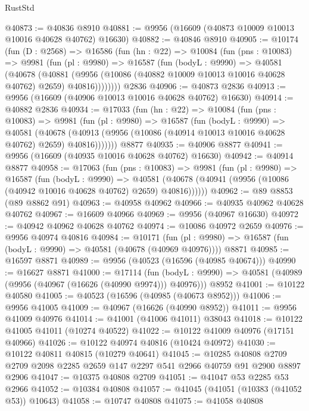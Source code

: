 \begin{lexlean}{RustStd}
\begin{coremodule}
@40873 := @40836 @8910
@40881 := @9956 (@16609 (@40873 @10009 @10013 @10016 @40628 @40762) @16630)
@40882 := @40846 @8910
@40905 := @10174
    (fun (D : @2568) =>
    @16586
      (fun (hn : @22) =>
      @10084
        (fun (pns : @10083) =>
        @9981
          (fun (pl : @9980) =>
          @16587
            (fun (bodyL : @9990) =>
            @40581
              (@40678
                (@40881
                  (@9956 (@10086 (@40882 @10009 @10013 @10016 @40628 @40762) @2659) @40816))))))))
    @2836
@40906 := @40873 @2836
@40913 := @9956 (@16609 (@40906 @10013 @10016 @40628 @40762) @16630)
@40914 := @40882 @2836
@40934 := @17033
    (fun (hn : @22) =>
    @10084
      (fun (pns : @10083) =>
      @9981
        (fun (pl : @9980) =>
        @16587
          (fun (bodyL : @9990) =>
          @40581
            (@40678 (@40913 (@9956 (@10086 (@40914 @10013 @10016 @40628 @40762) @2659) @40816)))))))
    @8877
@40935 := @40906 @8877
@40941 := @9956 (@16609 (@40935 @10016 @40628 @40762) @16630)
@40942 := @40914 @8877
@40958 := @17063
    (fun (pns : @10083) =>
    @9981
      (fun (pl : @9980) =>
      @16587
        (fun (bodyL : @9990) =>
        @40581 (@40678 (@40941 (@9956 (@10086 (@40942 @10016 @40628 @40762) @2659) @40816))))))
@40962 := @89 @8853 (@89 @8862 @91)
@40963 := @40958 @40962
@40966 := @40935 @40962 @40628 @40762
@40967 := @16609 @40966
@40969 := @9956 (@40967 @16630)
@40972 := @40942 @40962 @40628 @40762
@40974 := @10086 @40972 @2659
@40976 := @9956 @40974 @40816
@40984 := @10171
    (fun (pl : @9980) => @16587 (fun (bodyL : @9990) => @40581 (@40678 (@40969 @40976))))
    @8871
@40985 := @16597 @8871
@40989 := @9956 (@40523 (@16596 (@40985 @40674)))
@40990 := @16627 @8871
@41000 := @17114
    (fun (bodyL : @9990) => @40581 (@40989 (@9956 (@40967 (@16626 (@40990 @9974))) @40976)))
    @8952
@41001 := @10122 @40580
@41005 := @40523 (@16596 (@40985 (@40673 @8952)))
@41006 := @9956 @41005
@41009 := @40967 (@16626 (@40990 @8952))
@41011 := @9956 @41009 @40976
@41014 := @41001 (@41006 @41011) @38043
@41018 := @10122 @41005 @41011 (@10274 @40522)
@41022 := @10122 @41009 @40976 (@17151 @40966)
@41026 := @10122 @40974 @40816 (@10424 @40972)
@41030 := @10122 @40811 @40815 (@10279 @40641)
@41045 := @10285
    @40808
    @2709
    @2709
    @2098
    @2285
    @2659
    @147
    @2297
    @541
    @2966
    @40759
    @91
    @2900
    @8897
    @2906
@41047 := @10375 @40808 @2709
@41051 := @41047 @53 @2285 @53 @2966
@41052 := @10384 @40808
@41057 := @41045 (@41051 (@10383 (@41052 @53)) @10643)
@41058 := @10747 @40808
@41075 := @41058
    @40808

\end{coremodule}
\end{lexlean}
